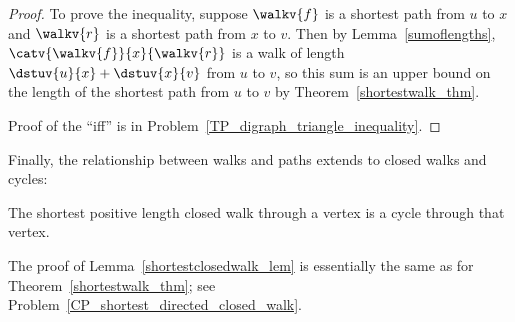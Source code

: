 \begin{proof}
  To prove the inequality, suppose $\walkv{f}$ is a shortest path from
  $u$ to $x$ and $\walkv{r}$ is a shortest path from $x$ to $v$.  Then
  by Lemma~\ref{sumoflengths}, $\catv{\walkv{f}}{x}{\walkv{r}}$ is a
  walk of length $\dstuv{u}{x} + \dstuv{x}{v}$ from $u$ to $v$, so
  this sum is an upper bound on the length of the shortest path from
  $u$ to $v$ by Theorem~\ref{shortestwalk_thm}.

  Proof of the ``iff'' is in Problem~\ref{TP_digraph_triangle_inequality}.
\end{proof}

Finally, the relationship between walks and paths extends to closed walks and
cycles:
\begin{lemma}\label{shortestclosedwalk_lem}
The shortest positive length closed walk through a vertex is a cycle
through that vertex.
\end{lemma}

The proof of Lemma~\ref{shortestclosedwalk_lem} is essentially the
same as for Theorem~\ref{shortestwalk_thm}; see
Problem~\ref{CP_shortest_directed_closed_walk}.

\begin{problems}
\practiceproblems
{}

\classproblems
{}

\homeworkproblems
{}

\end{problems}

